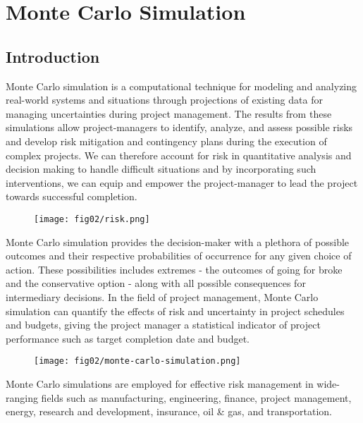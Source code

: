 \let\textcircled=\pgftextcircled
\chapter{Monte Carlo Simulation}
\label{chap:litrev}
\section{Introduction}
Monte Carlo simulation is a computational technique for modeling and analyzing real-world systems and situations through projections of existing data for managing uncertainties during project management. The results from these simulations allow project-managers to identify, analyze, and assess possible risks and develop risk mitigation and contingency plans during the execution of complex projects. We can therefore account for risk in quantitative analysis and decision making to handle difficult situations and by incorporating such interventions, we can equip and empower the project-manager to lead the project towards successful completion. 

\begin{figure}
	\centering
	\texttt{[image: fig02/risk.png]}
\end{figure}

Monte Carlo simulation \cite{mcoutcomes} provides the decision-maker with a plethora of possible outcomes and their respective probabilities of occurrence for any given choice of action. These possibilities includes extremes - the outcomes of going for broke and the conservative option - along with all possible consequences for intermediary decisions. In the field of project management, Monte Carlo simulation can quantify the effects of risk and uncertainty in project schedules and budgets, giving the project manager a statistical indicator of project performance such as target completion date and budget.


\begin{figure}
	\centering
	\texttt{[image: fig02/monte-carlo-simulation.png]}
\end{figure}

Monte Carlo simulations are employed for effective risk management \cite{MCinvest} in wide-ranging fields such as manufacturing, engineering, finance, project management, energy, research and development, insurance, oil \& gas, and transportation. 


